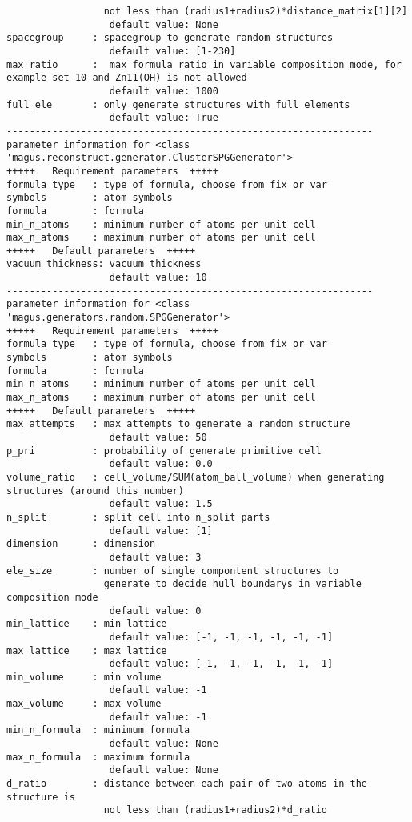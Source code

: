 \documentclass[12pt,oneside]{book}
\begin{document}
\begin{tcolorbox}
\begin{verbatim}
                 not less than (radius1+radius2)*distance_matrix[1][2]
                  default value: None
spacegroup     : spacegroup to generate random structures
                  default value: [1-230]
max_ratio      :  max formula ratio in variable composition mode, for example set 10 and Zn11(OH) is not allowed
                  default value: 1000
full_ele       : only generate structures with full elements
                  default value: True
----------------------------------------------------------------
parameter information for <class 'magus.reconstruct.generator.ClusterSPGGenerator'>
+++++	Requirement parameters	+++++
formula_type   : type of formula, choose from fix or var
symbols        : atom symbols
formula        : formula
min_n_atoms    : minimum number of atoms per unit cell
max_n_atoms    : maximum number of atoms per unit cell
+++++	Default parameters	+++++
vacuum_thickness: vacuum thickness
                  default value: 10
----------------------------------------------------------------
parameter information for <class 'magus.generators.random.SPGGenerator'>
+++++	Requirement parameters	+++++
formula_type   : type of formula, choose from fix or var
symbols        : atom symbols
formula        : formula
min_n_atoms    : minimum number of atoms per unit cell
max_n_atoms    : maximum number of atoms per unit cell
+++++	Default parameters	+++++
max_attempts   : max attempts to generate a random structure
                  default value: 50
p_pri          : probability of generate primitive cell
                  default value: 0.0
volume_ratio   : cell_volume/SUM(atom_ball_volume) when generating structures (around this number)
                  default value: 1.5
n_split        : split cell into n_split parts
                  default value: [1]
dimension      : dimension
                  default value: 3
ele_size       : number of single compontent structures to
                 generate to decide hull boundarys in variable composition mode
                  default value: 0
min_lattice    : min lattice
                  default value: [-1, -1, -1, -1, -1, -1]
max_lattice    : max lattice
                  default value: [-1, -1, -1, -1, -1, -1]
min_volume     : min volume
                  default value: -1
max_volume     : max volume
                  default value: -1
min_n_formula  : minimum formula
                  default value: None
max_n_formula  : maximum formula
                  default value: None
d_ratio        : distance between each pair of two atoms in the structure is
                 not less than (radius1+radius2)*d_ratio

\end{verbatim}
\end{tcolorbox}
\end{document}
